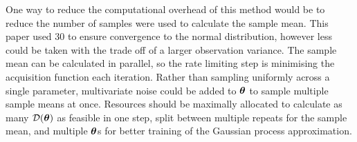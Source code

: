 One way to reduce the computational overhead of this method would be to reduce
the number of samples were used to calculate the sample mean. This paper used
30 to ensure convergence to the normal distribution, however less could be
taken with the trade off of a larger observation variance. The sample mean
can be calculated in parallel, so the rate limiting step is minimising the
acquisition function each iteration. Rather than sampling
uniformly across a single parameter, multivariate noise could be added to
$\bm{\theta}$ to sample multiple sample means at once.
Resources should be maximally allocated
to calculate as many $\mathcal{D}(\bm{\theta})$ as feasible in one step, split between
multiple repeats for the sample mean, and multiple $\bm{\theta}$s for better
training of the Gaussian process approximation.